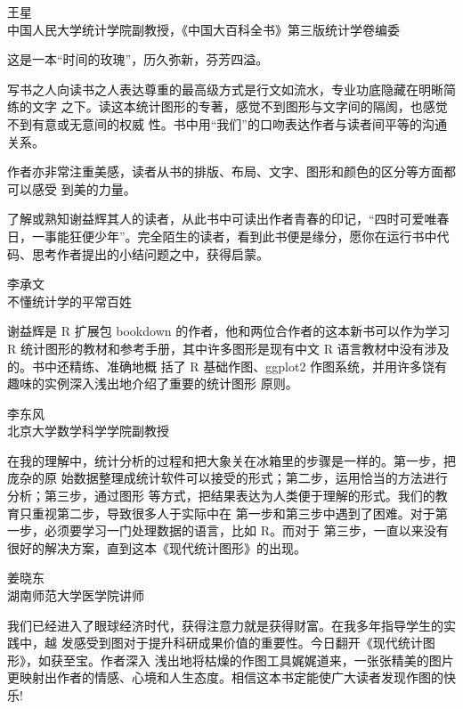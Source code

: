 \documentclass[
  b5paper,
  UTF8,twoside]{book}
\begin{document}
\begin{flushright}
王星\\
中国人民大学统计学院副教授，《中国大百科全书》第三版统计学卷编委
\end{flushright}

这是一本``时间的玫瑰''，历久弥新，芬芳四溢。

写书之人向读书之人表达尊重的最高级方式是行文如流水，专业功底隐藏在明晰简练的文字 之下。读这本统计图形的专著，感觉不到图形与文字间的隔阂，也感觉不到有意或无意间的权威 性。书中用``我们''的口吻表达作者与读者间平等的沟通关系。

作者亦非常注重美感，读者从书的排版、布局、文字、图形和颜色的区分等方面都可以感受 到美的力量。

了解或熟知谢益辉其人的读者，从此书中可读出作者青春的印记，``四时可爱唯春日，一事能狂便少年''。完全陌生的读者，看到此书便是缘分，愿你在运行书中代码、思考作者提出的小结问题之中，获得启蒙。

\begin{flushright}
李承文\\
不懂统计学的平常百姓
\end{flushright}

谢益辉是 R 扩展包 bookdown 的作者，他和两位合作者的这本新书可以作为学习 R 统计图形的教材和参考手册，其中许多图形是现有中文 R 语言教材中没有涉及的。书中还精练、准确地概 括了 R 基础作图、ggplot2 作图系统，并用许多饶有趣味的实例深入浅出地介绍了重要的统计图形 原则。

\begin{flushright}
李东风\\
北京大学数学科学学院副教授
\end{flushright}

在我的理解中，统计分析的过程和把大象关在冰箱里的步骤是一样的。第一步，把庞杂的原 始数据整理成统计软件可以接受的形式；第二步，运用恰当的方法进行分析；第三步，通过图形 等方式，把结果表达为人类便于理解的形式。我们的教育只重视第二步，导致很多人于实际中在 第一步和第三步中遇到了困难。对于第一步，必须要学习一门处理数据的语言，比如 R。而对于 第三步，一直以来没有很好的解决方案，直到这本《现代统计图形》的出现。

\begin{flushright}
姜晓东\\
湖南师范大学医学院讲师
\end{flushright}

我们已经进入了眼球经济时代，获得注意力就是获得财富。在我多年指导学生的实践中，越 发感受到图对于提升科研成果价值的重要性。今日翻开《现代统计图形》，如获至宝。作者深入 浅出地将枯燥的作图工具娓娓道来，一张张精美的图片更映射出作者的情感、心境和人生态度。相信这本书定能使广大读者发现作图的快乐!
\end{document}
